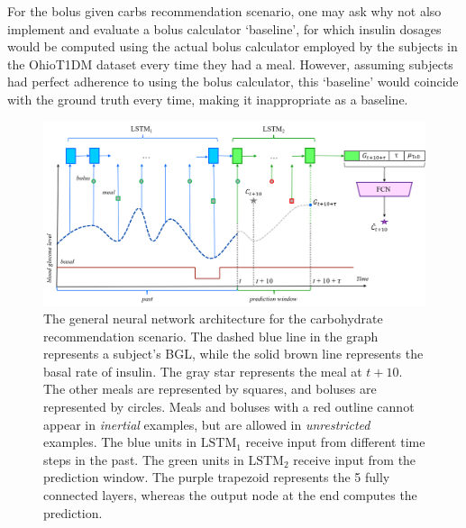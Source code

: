 \documentclass[graybox]{svmult}
\begin{document}
For the bolus given carbs recommendation scenario, one may ask why not also implement and evaluate a bolus calculator `baseline', for which insulin dosages would be computed using the actual bolus calculator employed by the subjects in the OhioT1DM dataset every time they had a meal. However, assuming subjects had perfect adherence to using the bolus calculator, this `baseline' would coincide with the ground truth every time, making it inappropriate as a baseline.

\begin{figure}[t]
    \includegraphics[width=\textwidth]{kdh_paper_diagram_1}
    \caption{The general neural network architecture for the carbohydrate recommendation scenario. The dashed blue line in the graph represents a subject's BGL, while the solid brown line represents the basal rate of insulin. The gray star represents the meal at $t+10$. The other meals are represented by squares, and boluses are represented by circles. Meals and boluses with a red outline cannot appear in {\it inertial} examples, but are allowed in {\it unrestricted} examples. The blue units in $\text{LSTM}_{1}$ receive input from different time steps in the past. The green units in $\text{LSTM}_{2}$ receive input from the prediction window. The purple trapezoid represents the 5 fully connected layers, whereas the output node at the end computes the prediction.}
    \label{fig:carbs}
\end{figure}
\end{document}
